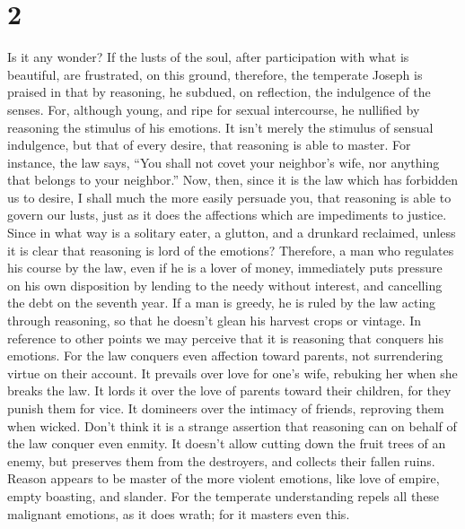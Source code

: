 \hypertarget{section-1}{%
\section{2}\label{section-1}}

 Is it any wonder? If the lusts of the soul, after
participation with what is beautiful, are frustrated,  on
this ground, therefore, the temperate Joseph is praised in that by
reasoning, he subdued, on reflection, the indulgence of the senses.
 For, although young, and ripe for sexual intercourse, he
nullified by reasoning the stimulus of his emotions.  It
isn't merely the stimulus of sensual indulgence, but that of every
desire, that reasoning is able to master.  For instance,
the law says, ``You shall not covet your neighbor's wife, nor anything
that belongs to your neighbor.''  Now, then, since it is
the law which has forbidden us to desire, I shall much the more easily
persuade you, that reasoning is able to govern our lusts, just as it
does the affections which are impediments to justice. 
Since in what way is a solitary eater, a glutton, and a drunkard
reclaimed, unless it is clear that reasoning is lord of the emotions?
 Therefore, a man who regulates his course by the law,
even if he is a lover of money, immediately puts pressure on his own
disposition by lending to the needy without interest, and cancelling the
debt on the seventh year.  If a man is greedy, he is ruled
by the law acting through reasoning, so that he doesn't glean his
harvest crops or vintage. In reference to other points we may perceive
that it is reasoning that conquers his emotions.  For the
law conquers even affection toward parents, not surrendering virtue on
their account.  It prevails over love for one's wife,
rebuking her when she breaks the law.  It lords it over
the love of parents toward their children, for they punish them for
vice. It domineers over the intimacy of friends, reproving them when
wicked.  Don't think it is a strange assertion that
reasoning can on behalf of the law conquer even enmity. 
It doesn't allow cutting down the fruit trees of an enemy, but preserves
them from the destroyers, and collects their fallen ruins.
 Reason appears to be master of the more violent
emotions, like love of empire, empty boasting, and slander.
 For the temperate understanding repels all these
malignant emotions, as it does wrath; for it masters even this.

